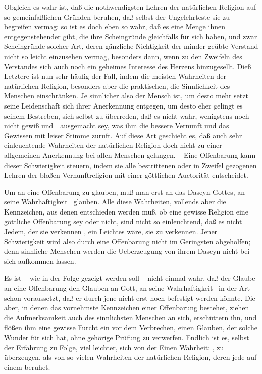 \begin{aufza}
\item Obgleich es wahr ist, daß die nothwendigsten Lehren der natürlichen Religion auf so gemeinfaßlichen Gründen beruhen, daß selbst der Ungelehrteste sie zu begreifen vermag: so ist es doch eben so wahr, daß es eine Menge ihnen entgegenstehender  gibt, die ihre Scheingründe gleichfalls für sich haben, und zwar Scheingründe solcher Art, deren gänzliche Nichtigkeit der minder geübte Verstand nicht so leicht einzusehen vermag, besonders dann, wenn zu den Zweifeln des Verstandes sich auch noch ein geheimes Interesse des Herzens hinzugesellt. Dieß Letztere ist nun sehr häufig der Fall, indem die meisten Wahrheiten der natürlichen Religion, besonders aber die praktischen, die Sinnlichkeit des Menschen einschränken. Je sinnlicher also der Mensch ist, um desto mehr setzt seine Leidenschaft sich ihrer Anerkennung entgegen, um desto eher gelingt es seinem Bestreben, sich selbst zu überreden, daß es nicht wahr, wenigstens noch nicht gewiß und~\ ausgemacht sey, was ihm die bessere Vernunft und das Gewissen mit leiser Stimme zuruft. Auf diese Art geschieht es, daß auch sehr einleuchtende Wahrheiten der natürlichen Religion doch nicht zu einer allgemeinen Anerkennung bei allen Menschen gelangen. -- Eine Offenbarung kann dieser Schwierigkeit steuern, indem sie alle bestrittenen oder in Zweifel gezogenen Lehren der bloßen Vernunftreligion mit einer göttlichen Auctorität entscheidet.
\item[\RWbet{Einwurf.}] Um an eine Offenbarung zu glauben, muß man erst an das Daseyn Gottes, an seine Wahrhaftigkeit \umA\  glauben. Alle diese Wahrheiten, vollends aber die Kennzeichen, aus denen entschieden werden muß, ob eine gewisse Religion eine göttliche Offenbarung sey oder nicht, sind nicht so einleuchtend, daß es nicht Jedem, der sie verkennen , ein Leichtes wäre, sie zu verkennen. Jener Schwierigkeit wird also durch eine Offenbarung nicht im Geringsten abgeholfen; denn sinnliche Menschen werden die Ueberzeugung von ihrem Daseyn nicht bei sich aufkommen lassen.
\item[\RWbet{Antwort.}] Es ist -- wie in der Folge gezeigt werden soll -- nicht einmal wahr, daß der Glaube an eine Offenbarung den Glauben an Gott, an seine Wahrhaftigkeit \usw\ in der Art schon voraussetzt, daß er durch jene nicht erst noch befestigt werden könnte. Die  aber, in denen das vornehmste Kennzeichen einer Offenbarung bestehet, ziehen die Aufmerksamkeit auch des sinnlichsten Menschen an sich, erschüttern ihn, und flößen ihm eine gewisse Furcht ein vor dem Verbrechen, einen Glauben, der solche Wunder für sich hat, ohne gehörige Prüfung zu verwerfen. Endlich ist es, selbst der Erfahrung zu Folge, viel leichter, sich von der Einen Wahrheit: , zu überzeugen, als von so vielen Wahrheiten der natürlichen Religion, deren jede auf einem  beruhet.

\end{aufza}
